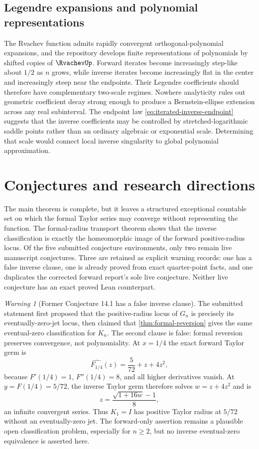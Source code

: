 \documentclass[11pt,oneside]{article}
\theoremstyle{definition}
\theoremstyle{remark}
\newtheorem{warning}[theorem]{Warning}
\newcommand{\FormalTaylorGerm}[1]{\widehat{#1}}
\begin{document}
\subsection{Legendre expansions and polynomial representations}

The Rvachev function admits rapidly convergent orthogonal-polynomial expansions, and
the repository develops finite representations of polynomials by shifted copies of
$\RvachevUp$.  Forward iterates become increasingly step-like about $1/2$ as $n$ grows, while
inverse iterates become increasingly flat in the center and increasingly steep near the
endpoints.  Their Legendre coefficients should therefore have complementary two-scale
regimes.  Nowhere analyticity rules out geometric coefficient decay strong enough to
produce a Bernstein-ellipse extension across any real subinterval.  The endpoint law
\eqref{eq:iterated-inverse-endpoint} suggests that the inverse coefficients may be
controlled by stretched-logarithmic saddle points rather than an ordinary algebraic or
exponential scale.  Determining that scale would connect local inverse singularity to
global polynomial approximation.

\section{Conjectures and research directions}
\label{sec:future}

The main theorem is complete, but it leaves a structured exceptional countable set on
which the formal Taylor series may converge without representing the function.  The
formal-radius transport theorem shows that the inverse classification is exactly the
homeomorphic image of the forward positive-radius locus.  Of the five submitted
conjecture environments, only two remain live manuscript conjectures.  Three are
retained as explicit warning records: one has a false inverse clause, one is already
proved from exact quarter-point facts, and one duplicates the corrected forward
report's sole live conjecture.  Neither live conjecture has an exact proved Lean
counterpart.

\begin{warning}[Former Conjecture 14.1 has a false inverse clause]
\label{warn:trichotomy}
The submitted statement first proposed that the positive-radius locus of $G_n$ is
precisely its eventually-zero-jet locus, then claimed that
\cref{thm:formal-reversion} gives the same eventual-zero classification for $K_n$.
The second clause is false: formal reversion preserves convergence, not polynomiality.
At $x=1/4$ the exact forward Taylor germ is
\[
 \FormalTaylorGerm{F_{1/4}}(z)=\frac5{72}+z+4z^2,
\]
because $F'(1/4)=1$, $F''(1/4)=8$, and all higher derivatives vanish.  At
$y=F(1/4)=5/72$, the inverse Taylor germ therefore solves $w=z+4z^2$ and is
\[
 z=\frac{\sqrt{1+16w}-1}{8},
\]
an infinite convergent series.  Thus $K_1=I$ has positive Taylor radius at $5/72$
without an eventually-zero jet.  The forward-only assertion remains a plausible open
classification problem, especially for $n\geq2$, but no inverse eventual-zero
equivalence is asserted here.
\end{warning}
\end{document}
